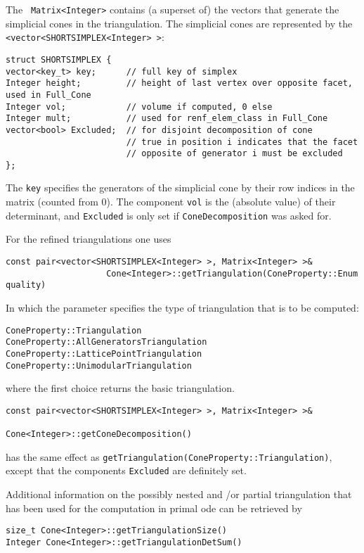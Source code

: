 \begin{small}
The \verb| Matrix<Integer>| contains (a superset of) the vectors that generate the simplicial cones in the triangulation. The simplicial cones are represented by the \verb|<vector<SHORTSIMPLEX<Integer> >|:
\begin{Verbatim}
struct SHORTSIMPLEX {
vector<key_t> key;      // full key of simplex
Integer height;         // height of last vertex over opposite facet, used in Full_Cone
Integer vol;            // volume if computed, 0 else
Integer mult;           // used for renf_elem_class in Full_Cone
vector<bool> Excluded;  // for disjoint decomposition of cone
                        // true in position i indicates that the facet
                        // opposite of generator i must be excluded
};
\end{Verbatim}
The \verb|key| specifies the generators of the simplicial cone by their row indices in the matrix (counted from $0$). The component \verb|vol| is the (absolute value) of their determinant, and \verb|Excluded| is only set if \verb|ConeDecomposition| was asked for.

For the refined triangulations one uses
\begin{Verbatim}
const pair<vector<SHORTSIMPLEX<Integer> >, Matrix<Integer> >& 
                    Cone<Integer>::getTriangulation(ConeProperty::Enum quality)
\end{Verbatim}
In which the parameter specifies the type of triangulation that is to be computed:
\begin{Verbatim}
ConeProperty::Triangulation
ConeProperty::AllGeneratorsTriangulation
ConeProperty::LatticePointTriangulation
ConeProperty::UnimodularTriangulation
\end{Verbatim}
where the first choice returns the basic triangulation.

\begin{Verbatim}
const pair<vector<SHORTSIMPLEX<Integer> >, Matrix<Integer> >&
                                           Cone<Integer>::getConeDecomposition()
\end{Verbatim}
has the same effect as \verb|getTriangulation(ConeProperty::Triangulation)|, except that the components \verb|Excluded| are definitely set.

Additional information on the possibly nested and /or partial triangulation that has been used for the computation in primal ode can be retrieved by
\begin{Verbatim}
size_t Cone<Integer>::getTriangulationSize()
Integer Cone<Integer>::getTriangulationDetSum() 
\end{Verbatim}


\end{small}
